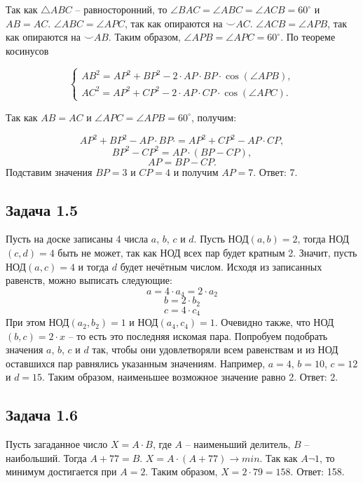 \documentclass[12pt]{article}
\begin{document}
Так как $\triangle ABC$ -- равносторонний, то $\angle BAC = \angle ABC = \angle ACB = 60^{\circ}$ и $AB = AC$. $\angle ABC = \angle APC$, так как опираются на $\smile AC$. $\angle ACB = \angle APB$, так как опираются на $\smile{AB}$. Таким образом, $\angle APB = \angle APC = 60^{\circ}$. По теореме косинусов 

\begin{equation*} 
    \begin{cases}
    AB^2 = AP^2 + BP^2 - 2 \cdot AP\cdot BP\cdot \cos(\angle APB),\\
    AC^2 = AP^2 + CP^2 - 2 \cdot AP\cdot CP\cdot \cos(\angle APC).
    \end{cases}
\end{equation*}

Так как $AB = AC$ и $\angle APC = \angle APB = 60^{\circ}$, получим:

$$AP^2 + BP^2 - AP\cdot BP\cdot = AP^2 + CP^2 - AP\cdot CP,$$
$$BP^2 - CP^2 = AP\cdot (BP - CP),$$
$$AP = BP - CP.$$
Подставим значения $BP = 3$ и $CP = 4$ и получим $AP = 7$. Ответ: 7.

\subsection*{Задача 1.5}
Пусть на доске записаны 4 числа $a$, $b$, $c$ и $d$. Пусть НОД$(a, b) = 2$, тогда НОД$(c, d) = 4$ быть не может, так как НОД всех пар будет кратным 2. Значит, пусть НОД$(a, c) = 4$ и тогда $d$ будет нечётным числом.
Исходя из записанных равенств, можно выписать следующие:
$$a = 4\cdot a_4 = 2 \cdot a_2$$
$$b = 2\cdot b_2$$
$$c = 4\cdot c_4$$
При этом НОД$(a_2, b_2) = 1$ и НОД$(a_4, c_4) = 1$. Очевидно также, что НОД$(b, c) = 2 \cdot x$ -- то есть это последняя искомая пара. Попробуем подобрать значения $a$, $b$, $c$ и $d$ так, чтобы они удовлетворяли всем равенствам и из НОД оставшихся пар равнялись указанным значениям. Например, $a = 4$, $b = 10$, $c = 12$ и $d = 15$. Таким образом, наименьшее возможное значение равно 2. Ответ: 2.

\subsection*{Задача 1.6}
Пусть загаданное число $X = A \cdot B$, где $A$ -- наименьший делитель, $B$ -- наибольший. Тогда $A + 77 = B$. $X = A \cdot (A + 77) \to min$. Так как $A \neg 1$, то минимум достигается при $A = 2$. Таким образом, $X = 2 \cdot 79 = 158$. Ответ: 158.  
\end{document}
